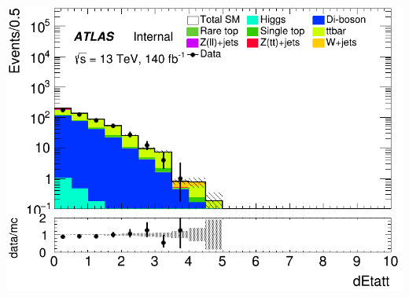 \documentclass[usenames,dvipsnames]{beamer}
\begin{document}
\begin{frame}
    \begin{minipage}{0.32\textwidth}
        \centering
        \includegraphics[width=\textwidth]{graphics/LLH_met/LLH_met_dEtatt.png}
    \end{minipage}
    
    \vspace{0.5cm} %
\end{frame}
\end{document}

